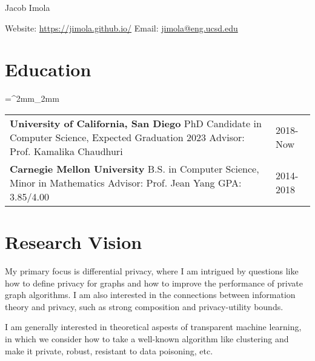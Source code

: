 \documentclass[11pt]{article}
\begin{document}


\centerline{{\Huge Jacob Imola}}
\noindent Website: \href{https://jimola.github.io/}{https://jimola.github.io/} \hfill Email: \href{mailto:jimola@eng.ucsd.edu}{jimola@eng.ucsd.edu}

\section*{Education}
\tabulinesep=^2mm_2mm
\begin{tabu}{X[4, l] X[1, l]}
	\setlength{\extrarowsep}{3mm}
  \textbf{University of California, San Diego} \newline
  PhD Candidate in Computer Science, Expected Graduation 2023 \newline
  Advisor: Prof. Kamalika Chaudhuri 
	&
  2018-Now \\
  \textbf{Carnegie Mellon University} \newline
  B.S. in Computer Science, Minor in Mathematics \newline
  Advisor: Prof. Jean Yang \newline
  GPA: 3.85/4.00
	&
  2014-2018 \\
\end{tabu}

\section*{Research Vision}
My primary focus is differential privacy, where I 
am intrigued by questions like how to define privacy for graphs and how to improve the performance of private graph algorithms.
I am also interested in the connections between information theory and privacy, such as strong composition and privacy-utility bounds.

I am generally interested in theoretical aspests of transparent machine learning, in which we consider how to take a well-known 
algorithm like clustering and make it private, robust, resistant to data poisoning, etc.
\end{document}
